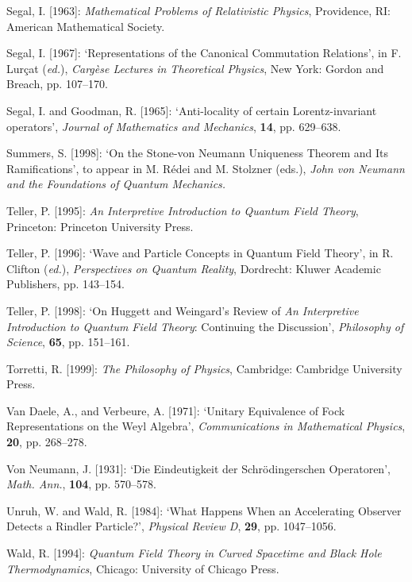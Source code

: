 \documentclass[12pt]{article}
\theoremstyle{remark}
\theoremstyle{definition}
\begin{document}
\noindent Segal, I. [1963]: \textit{Mathematical Problems of Relativistic Physics},
Providence, RI: American Mathematical Society.\vspace{.1in}

\noindent Segal, I.  [1967]: `Representations of the Canonical Commutation
Relations', in F. Lur\c{c}at (\textit{ed.}), \textit{Carg\`{e}se Lectures in
Theoretical Physics}, New York: Gordon and Breach, pp. 107--170.\vspace{.1in}

\noindent Segal, I. and Goodman, R. [1965]: `Anti-locality of certain
Lorentz-invariant operators', {\it Journal of Mathematics and
  Mechanics}, {\bf 14}, pp. 629--638.\vspace{.1in}

\noindent Summers, S. [1998]: `On the Stone-von Neumann Uniqueness Theorem
and Its Ramifications', to appear in M. R\'{e}dei and M. Stolzner (eds.),
\textit{John von Neumann and the Foundations of Quantum Mechanics.}\vspace{.1in}

\noindent Teller, P. [1995]: \textit{An Interpretive Introduction to Quantum
  Field Theory}, Princeton: Princeton University Press.\vspace{.1in}
  
  \noindent Teller, P. [1996]: `Wave and Particle Concepts in Quantum Field Theory', in
R. Clifton (\textit{ed.}), \textit{Perspectives on Quantum Reality},
Dordrecht: Kluwer Academic Publishers, pp. 143--154.\vspace{.1in}
  
 \noindent Teller, P. [1998]: `On Huggett and Weingard's Review of 
 \textit{An Interpretive Introduction to Quantum Field Theory}: Continuing the
Discussion', \textit{Philosophy of Science}, \textbf{65}, pp.
151--161.\vspace{.1in}

  \noindent Torretti, R. [1999]: \textit{The Philosophy of Physics}, Cambridge: 
  Cambridge University Press.\vspace{.1in}
  
  \noindent Van Daele, A., and Verbeure, A. [1971]: `Unitary 
  Equivalence of Fock Representations on the Weyl Algebra', 
  \emph{Communications in Mathematical Physics}, \textbf{20}, pp. 
  268--278.\vspace{.1in}
  
 \noindent Von Neumann, J. [1931]: `Die Eindeutigkeit der Schr\"{o}dingerschen 
 Operatoren', \emph{Math. Ann.}, {\bf 104}, pp. 570--578.\vspace{.1in}
 
 \noindent Unruh, W. and Wald, R. [1984]: `What Happens When an Accelerating 
 Observer Detects a Rindler Particle?', \emph{Physical Review D}, 
 {\bf 29}, pp. 1047--1056.\vspace{.1in}
  
\noindent Wald, R. [1994]: \textit{Quantum Field Theory in Curved Spacetime and Black
Hole Thermodynamics}, Chicago: University of Chicago Press.\vspace{.1in}
\end{document}
